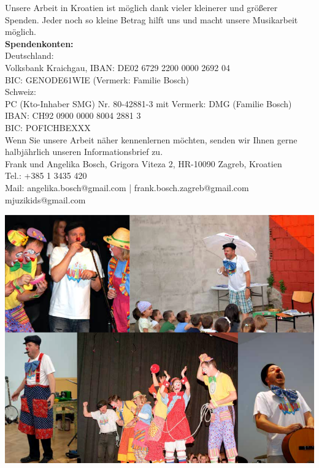 \documentclass[a4paper,twoside, svgnames]{article}
\begin{document}
\newpage
\begin{center}
Unsere Arbeit in Kroatien ist möglich dank vieler kleinerer und größerer Spenden. Jeder noch so
kleine Betrag hilft uns und macht unsere Musikarbeit möglich.\\
\vspace*{0.2cm}
\textbf{Spendenkonten:}\\
\vspace*{0.1cm}
Deutschland:\\
Volksbank Kraichgau, IBAN: DE02 6729 2200 0000 2692 04\\
BIC: GENODE61WIE (Vermerk: Familie Bosch)\\
\vspace*{0.2cm}
Schweiz:\\
PC (Kto-Inhaber SMG) Nr. 80-42881-3 mit Vermerk: DMG (Familie Bosch)\\
IBAN: CH92 0900 0000 8004 2881 3\\
BIC: POFICHBEXXX\\
\vspace*{1cm}
Wenn Sie unsere Arbeit näher kennenlernen möchten, senden wir Ihnen gerne
halbjährlich unseren Informationsbrief zu.\\
Frank und Angelika Bosch, Grigora Viteza 2, HR-10090 Zagreb, Kroatien\\
Tel.: +385 1 3435 420\\
Mail: angelika.bosch@gmail.com | frank.bosch.zagreb@gmail.com\\
mjuzikids@gmail.com

\vfill
\includegraphics[width=\linewidth]{images/klauni}\\

\end{center}
\end{document}
